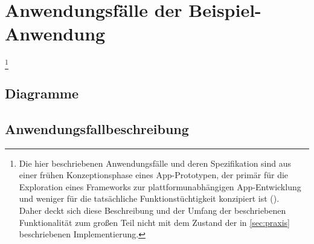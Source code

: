 
\chapter{Anwendungsfälle der Beispiel-Anwendung} \label{sec:af}
\footnote{Die hier beschriebenen Anwendungsfälle und deren Spezifikation sind aus einer frühen Konzeptionsphase eines App-Prototypen, der primär für die Exploration eines Frameworks zur plattformunabhängigen App-Entwicklung und weniger für die tatsächliche Funktionstüchtigkeit konzipiert ist ().\\
Daher deckt sich diese Beschreibung und der Umfang der beschriebenen Funktionalität zum großen Teil nicht mit dem Zustand der in \autoref{sec:praxis} beschriebenen Implementierung.}

\section{Diagramme}


\pagebreak
{}

\restoregeometry
\pagebreak

\section{Anwendungsfallbeschreibung}

	\label{manageLists}

